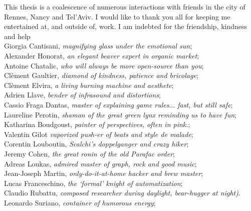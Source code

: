\mynewline
This thesis is a coalescence of numerous interactions with friends in the city of Rennes, Nancy and Tel'Aviv.
I would like to thank you all for keeping me entertained at, and outside of, work.
I am indebted for the friendship, kindness and help{\small
\\\hspace*{0.3cm} Giorgia Cantisani, \textit{magnifying glass under the emotional sun};
\\\hspace*{0.3cm} Alexander Honorat, \textit{an elegant beaver expert in organic market};
\\\hspace*{0.3cm} Antoine Chatalic, \textit{who will always be more open-source than you};
\\\hspace*{0.3cm} Cl\`ement Gaultier, \textit{diamond of kindness, patience and bricolage};
\\\hspace*{0.3cm} Cl\`ement Elvira, \textit{a living burning machine and aesthete};
\\\hspace*{0.3cm} Adrien Llave, \textit{bender of infrasound and distortions};
\\\hspace*{0.3cm} Cassio Fraga Dantas, \textit{master of explaining game rules$\ldots$ fast, but still safe};
\\\hspace*{0.3cm} Laureline Perotin, \textit{shaman of the great green lynx reminding us to have fun};
\\\hspace*{0.3cm} Katharina Boudgoust, \textit{painter of perspectives, often in pink.};
\\\hspace*{0.3cm} Valentin Gilot \textit{vaporized push-er of beats and style de malade};
\\\hspace*{0.3cm} Corentin Louboutin, \textit{Scalchi's doppelganger and crazy hiker};
\\\hspace*{0.3cm} Jeremy Cohen, \textit{the great ronin of the old Parafac order};
\\\hspace*{0.3cm} Adreas Loukas, \textit{admired master of graph, rock and good music};
\\\hspace*{0.3cm} Jean-Joseph Martin, \textit{only-do-it-at-home hacker and brew master};
\\\hspace*{0.3cm} Lucas Franceschino, \textit{the `formal' knight of automatization};
\\\hspace*{0.3cm} Claudio Rubattu, \textit{composed researcher during daylight, bear-hugger at night)}.
\\\hspace*{0.3cm} Leonardo Suriano, \textit{container of humorous energy};
}
